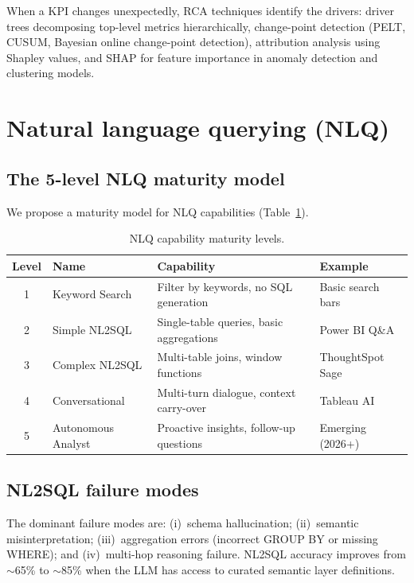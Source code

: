 \documentclass[preprint,12pt,authoryear]{elsarticle}
\theoremstyle{definition}
\begin{document}
When a KPI changes unexpectedly, RCA techniques identify the drivers: driver trees decomposing top-level metrics hierarchically, change-point detection (PELT, CUSUM, Bayesian online change-point detection), attribution analysis using Shapley values, and SHAP for feature importance in anomaly detection and clustering models.

\section{Natural language querying (NLQ)}\label{sec:nlq}

\subsection{The 5-level NLQ maturity model}

We propose a maturity model for NLQ capabilities (Table~\ref{tab:nlq-levels}).

\begin{table}[ht]
\centering
\caption{NLQ capability maturity levels.}
\label{tab:nlq-levels}
\begin{tabular}{clll}
\toprule
\textbf{Level} & \textbf{Name} & \textbf{Capability} & \textbf{Example} \\
\midrule
1 & Keyword Search     & Filter by keywords, no SQL generation  & Basic search bars \\
2 & Simple NL2SQL      & Single-table queries, basic aggregations & Power BI Q\&A \\
3 & Complex NL2SQL     & Multi-table joins, window functions      & ThoughtSpot Sage \\
4 & Conversational     & Multi-turn dialogue, context carry-over  & Tableau AI \\
5 & Autonomous Analyst & Proactive insights, follow-up questions  & Emerging (2026+) \\
\bottomrule
\end{tabular}
\end{table}

\subsection{NL2SQL failure modes}

The dominant failure modes are: (i)~schema hallucination; (ii)~semantic misinterpretation; (iii)~aggregation errors (incorrect GROUP BY or missing WHERE); and (iv)~multi-hop reasoning failure. NL2SQL accuracy improves from $\sim$65\% to $\sim$85\% when the LLM has access to curated semantic layer definitions.
\end{document}
